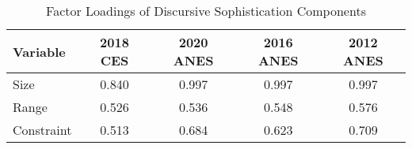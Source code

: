 \begin{table}[ht]
\centering
\begin{tabular}{lcccc}
  \hline
Variable & 2018 CES & 2020 ANES & 2016 ANES & 2012 ANES \\ 
  \hline
Size & 0.840 & 0.997 & 0.997 & 0.997 \\ 
  Range & 0.526 & 0.536 & 0.548 & 0.576 \\ 
  Constraint & 0.513 & 0.684 & 0.623 & 0.709 \\ 
   \hline
\end{tabular}
\caption{Factor Loadings of Discursive Sophistication Components} 
\label{app:factload}
\end{table}
